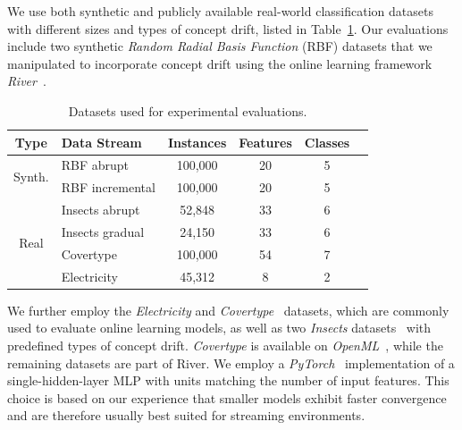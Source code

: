 \documentclass{article} %
\begin{document}
We use both synthetic and publicly available real-world classification datasets with different sizes and types of concept drift, listed in Table~\ref{tab:datasets}.
Our evaluations include two synthetic \textit{Random Radial Basis Function} (RBF) datasets that we manipulated to incorporate concept drift using the online learning framework \textit{River}~\citep{montielRiverMachineLearning2020a}.

\begin{table}[ht]
   \centering
   \small
   \caption{Datasets used for experimental evaluations.}
   \begin{tabular}{@{}clcccc@{}}
      \toprule
      Type                    & Data Stream     & Instances               & Features & Classes \\
      \midrule
      \multirow{2}{*}{Synth.} & RBF abrupt      & 100,000                 & 20       & 5       \\
                              & RBF incremental & 100,000                 & 20       & 5       \\
      \midrule
      \multirow{5}{*}{Real}   & Insects abrupt  & 52,848                  & 33       & 6       \\
                              & Insects gradual & 24,150                  & 33       & 6       \\
                              & Covertype       & 100,000\footnotemark[3] & 54       & 7       \\
                              & Electricity     & 45,312                  & 8        & 2       \\
      \bottomrule
   \end{tabular}
   \label{tab:datasets}
\end{table}


We further employ the \textit{Electricity} and \textit{Covertype}~\citep{misc_covertype_31} datasets, which are commonly used to evaluate online learning models, as well as two \textit{Insects} datasets~\citep{souzaChallengesBenchmarkingStream2020} with predefined types of concept drift.
\textit{Covertype} is available on \textit{OpenML}~\citep{vanschorenOpenMLNetworkedScience2014}, while the remaining datasets are part of River.
We employ a \textit{PyTorch}~\citep{paszkePyTorchImperativeStyle2019} implementation of a single-hidden-layer MLP with units matching the number of input features.
This choice is based on our experience that smaller models exhibit faster convergence and are therefore usually best suited for streaming environments.
\end{document}
